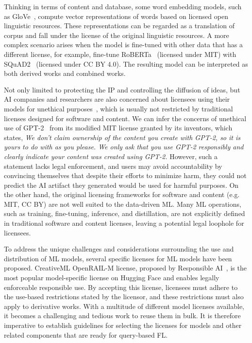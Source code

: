 
Thinking in terms of content and database, some word embedding models, such as GloVe~\cite{pennington2014glove}, compute vector representations of words based on licensed open linguistic resources.
These representations can be regarded as a translation of corpus and fall under the license of the original linguistic resources.
A more complex scenario arises when the model is fine-tuned with other data that has a different license, for example, fine-tune RoBERTa~\cite{liu2019roberta} (licensed under MIT) with SQuAD2~\cite{rajpurkar2016squad} (licensed under CC BY 4.0).
The resulting model can be interpreted as both derived works and combined works.

Not only limited to protecting the IP and controlling the diffusion of ideas, but AI companies and researchers are also concerned about licensees using their models for unethical purposes~\cite{jobin2019global, awad2018moral, yuste2017four}, which is usually not restricted by traditional licenses designed for software and content.
We can infer the concerns of unethical use of GPT-2~\cite{radford2019language} from its modified MIT license granted by its inventors, which states, \textit{We don't claim ownership of the content you create with GPT-2, so it is yours to do with as you please. We only ask that you use GPT-2 responsibly and clearly indicate your content was created using GPT-2.} 
However, such a statement lacks legal enforcement, and users may avoid accountability by convincing themselves that despite their efforts to minimize harm, they could not predict the AI artifact they generated would be used for harmful purposes.
On the other hand, the original licensing frameworks for software and content (e.g. MIT, CC BY) are not well suited to the data-driven ML. 
Many ML operations, such as training, fine-tuning, inference, and distillation, are not explicitly defined in traditional software and content licenses, leaving a potential legal loophole for licensees.

To address the unique challenges and considerations surrounding the use and distribution of ML models, several specific licenses for ML models have been proposed. 
CreativeML OpenRAIL-M license, proposed by Responsible AI~\cite{contractor2022behavioral}, is the most popular model-specific license on Hugging Face and enables legally enforceable responsible use.
By accepting this license, licensees must adhere to the use-based restrictions stated by the licensor, and these restrictions must also apply to derivative works.
With a multitude of different model licenses available, it becomes a challenging and tedious work to reuse them in bulk. 
It is therefore imperative to establish guidelines for selecting the licenses for models and other related components that are ready for query-based FL.


